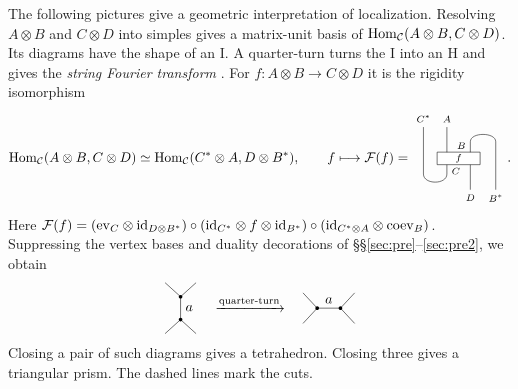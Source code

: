 \documentclass{amsart}
\begin{document}
The following pictures give a geometric interpretation of localization. Resolving $A\otimes B$ and $C\otimes D$ into simples gives a matrix-unit basis of $\mathrm{Hom}_{\mathcal{C}}(A\otimes B,C\otimes D)$. Its diagrams have the shape of an I. A quarter-turn turns the I into an H and gives the \emph{string Fourier transform} \cite{JafLiu18}. For $f:A\otimes B\to C\otimes D$ it is the rigidity isomorphism
\[
 \hc(A\otimes B,C\otimes D)\simeq\hc(C^*\otimes A,D\otimes B^*),
 \qquad f\longmapsto\mathcal F(f)=
\vcenter{\hbox{\begin{tikzpicture}[scale=.51,font=\scriptsize]
\draw (-1,1.6) node[above] {$C^*$} -- (-1,-.8)
  .. controls (-1,-1.35) and (.2,-1.35) .. (.2,-.8) -- (.2,-.25);
\draw (.2,1.6) node[above] {$A$} -- (.2,.25);
\draw (1.4,.25) -- (1.4,.85)
  .. controls (1.4,1.35) and (2.7,1.35) .. (2.7,.85)
  -- (2.7,-1.6) node[below] {$B^*$};
\draw (1.4,-.25) -- (1.4,-1.6) node[below] {$D$};
\node[left] at (1.4,.65) {$B$};
\node[right] at (.2,-.65) {$C$};
\draw[fill=white] (-.3,-.32) rectangle (1.9,.32);
\node at (.8,0) {$f$};
\end{tikzpicture}}}.
\]
Here $\mathcal F(f)=(\mathrm{ev}_C\otimes\mathrm{id}_{D\otimes B^*})\circ
(\mathrm{id}_{C^*}\otimes f\otimes\mathrm{id}_{B^*})\circ
(\mathrm{id}_{C^*\otimes A}\otimes\mathrm{coev}_B)$. Suppressing the vertex bases and duality decorations of \S\S\ref{sec:pre}--\ref{sec:pre2}, we obtain
\[
\begin{tikzpicture}[baseline=-.1cm,scale=.65]
\draw (-.6,1)--(0,.45)--(.6,1);
\draw (0,.45)--(0,-.45) node[midway,right] {$a$};
\draw (-.6,-1)--(0,-.45)--(.6,-1);
\fill (0,.45) circle(2pt);\fill(0,-.45) circle(2pt);
\end{tikzpicture}
\quad\xrightarrow{\text{quarter-turn}}\quad
\begin{tikzpicture}[baseline=-.1cm,scale=.65]
\draw (-1,.6)--(-.45,0)--(-1,-.6);
\draw (-.45,0)--(.45,0) node[midway,above] {$a$};
\draw (1,.6)--(.45,0)--(1,-.6);
\fill (-.45,0) circle(2pt);\fill(.45,0) circle(2pt);
\end{tikzpicture}
\]
Closing a pair of such diagrams gives a tetrahedron. Closing three gives a triangular prism. The dashed lines mark the cuts.
\end{document}
